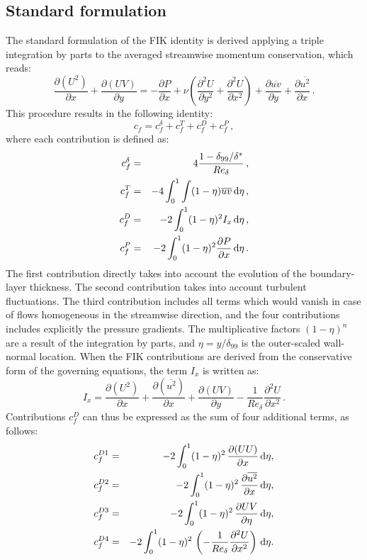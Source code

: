 \subsection{Standard formulation}
The standard formulation of the FIK identity is derived applying a triple integration by parts to the averaged streamwise momentum conservation, which reads:
\begin{equation}
    \frac{\partial (U^2)}{\partial x} + \frac{\partial (UV)}{\partial y} = - \frac{\partial P}{\partial x} + \nu \left ( \frac{\partial^2 U}{\partial y^2} + \frac{\partial^2 U}{\partial x^2} \right ) + \frac{\partial \overline{uv}}{\partial y} + \frac{\partial \overline{u^2}}{\partial x}\,.
    \label{eq:NSx}
\end{equation}
This procedure results in the following identity:
\begin{equation}
    c_f = c^\delta_f + c^T_f + c^D_f + c^P_f\,,
\end{equation}
where each contribution is defined as:
\begin{eqnarray}
    c^\delta_f&=&4\frac{1-\delta_{99}/\delta^*}{Re_\delta}\,, \\
    c^T_f&=&-4\int_0^1 \int (1-\eta) \overline{uv}\,{\rm d}\eta\,, \\ 
    c^D_f&=&-2\int_0^1(1-\eta)^2 I_x\, {\rm d}\eta\,, \\
    c^P_f&=&-2\int_0^1 (1-\eta)^2 \frac{\partial P}{\partial x}\, {\rm d}\eta\,.
\end{eqnarray}
The first contribution directly takes into account the evolution of the boundary-layer thickness. The second contribution takes into account turbulent fluctuations. The third contribution includes all terms which would vanish in case of flows homogeneous in the streamwise direction, and the four contributions includes explicitly the pressure gradients. The multiplicative factors $(1-\eta)^n$ are a result of the integration by parts, and $\eta=y/\delta_{99}$ is the outer-scaled wall-normal location. When the FIK contributions are derived from the conservative form of the governing equations, the term $I_x$ is written as:
\begin{equation}
    I_x = \frac{\partial (U^2)}{\partial x} + \frac{\partial (\overline{u^2})}{\partial x} + \frac{\partial (UV)}{\partial y} - \frac{1}{Re_{\delta}} \frac{\partial^2 U}{\partial x^2}\,.
\end{equation}
Contributions $c^D_f$ can thus be expressed as the sum of four additional terms, as follows:
\begin{eqnarray}
    c^{D1}_f&=& -2\int^1_0(1-\eta)^2\, \frac{\partial (UU)}{\partial x}\, {\rm d}\eta, \\
    c^{D2}_f&=& -2\int^1_0(1-\eta)^2\, \frac{\partial \overline{u^2}}{\partial x}\, {\rm d}\eta, \\ 
    c^{D3}_f&=& -2\int^1_0(1-\eta)^2\, \frac{\partial UV}{\partial \eta}\, {\rm d}\eta  , \\
    c^{D4}_f&=&  -2\int^1_0(1-\eta)^2\, \left ( - \frac{1}{Re_\delta} \frac{\partial^2 U}{\partial x^2} \right )\, {\rm d}\eta.
\end{eqnarray}
